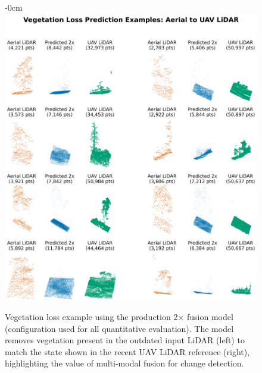 \documentclass[remotesensing,article,accept,pdftex,moreauthors]{Definitions/mdpi}
\renewcommand{\hl}[1]{#1}
\begin{document}
\begin{figure}[H]
\begin{adjustwidth}{-\extralength}{0cm}
    \centering
    \includegraphics[width=0.98\linewidth]{figures/veg_loss_2x.png}
    \end{adjustwidth}
    \caption{\hl{Vegetation} %
 loss example using the production 2$\times$ fusion model (configuration used for all quantitative evaluation). The model removes vegetation present in the outdated input LiDAR (left) to match the state shown in the recent UAV LiDAR reference (right), highlighting the value of multi-modal fusion for change detection.}
   \label{fig:appendix_loss}
\end{figure}

\end{document}
